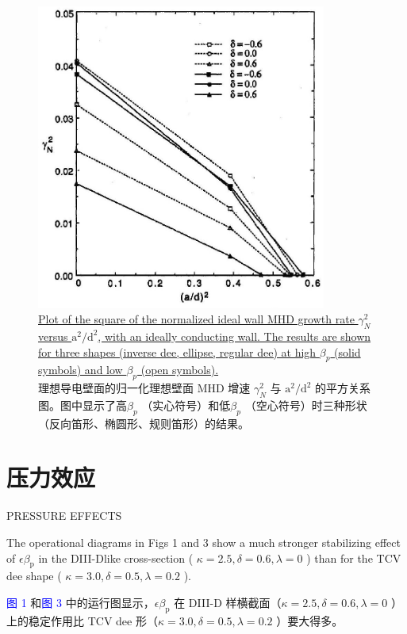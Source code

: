 \documentclass[utf8]{ctexart}
\newcommand\enzhbox[2]{
  	\quad\par \begin{paracol}{2} \colseprulecolor{black} 
  		\begin{spacing}{1.0}
  			\footnotesize  #1
  		\end{spacing}
  		\switchcolumn[1] 
  		#2
  	\end{paracol} \quad\par
  }
\begin{document}
\begin{sloppypar}
   \begin{figure}[H]
  	\centering
  	\includegraphics[max width=0.85\textwidth,max height=0.3\textheight]{2025_01_10_a0135324997886412d98g-6(1)}
 \caption{\uline{Plot of the square of the normalized ideal wall MHD growth rate $\gamma_{N}^{2}$ versus $\mathrm{a}^{2} / \mathrm{d}^{2}$, with an ideally conducting wall. The results are shown for three shapes (inverse dee, ellipse, regular dee) at high $\beta_{p}$ (solid symbols) and low $\beta_{p}$ (open symbols).}\\理想导电壁面的归一化理想壁面 MHD 增速 $\gamma_{N}^{2}$  与 $\mathrm{a}^{2} / \mathrm{d}^{2}$ 的平方关系图。图中显示了高$\beta_{p}$ （实心符号）和低$\beta_{p}$ （空心符号）时三种形状（反向笛形、椭圆形、规则笛形）的结果。}
  	\label{fig}
  \end{figure}
 
  
 \section{压力效应}
 {  \small PRESSURE EFFECTS \par }
  
 
\enzhbox{  The operational diagrams in Figs 1 and 3 show a much stronger stabilizing effect of $\epsilon \beta_{\mathrm{p}}$ in the DIII-Dlike cross-section ( $\kappa=2.5, \delta=0.6, \lambda=0$ ) than for the TCV dee shape ( $\kappa=3.0, \delta=0.5, \lambda=0.2$ ).}{
\textcolor{blue}{图 1} 和\textcolor{blue}{图 3} 中的运行图显示，$\epsilon \beta_{\mathrm{p}}$  在 DIII-D 样横截面（$\kappa=2.5, \delta=0.6, \lambda=0$  ）上的稳定作用比 TCV dee 形（$\kappa=3.0, \delta=0.5, \lambda=0.2$  ）要大得多。}
  

\end{sloppypar}
\end{document}

